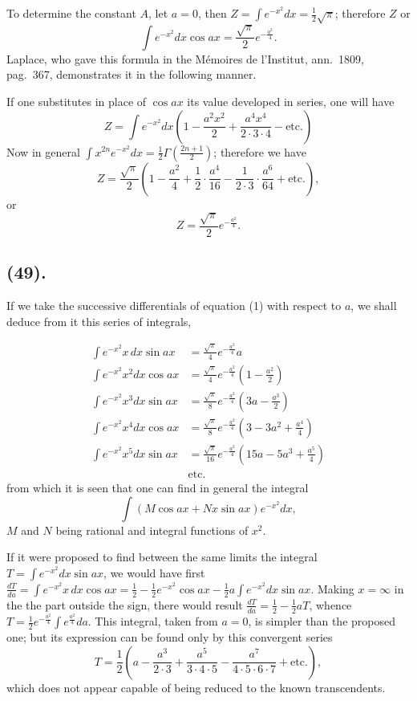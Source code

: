\documentclass{article}
\begin{document}
To determine the constant $A$, let $a=0$, then $\displaystyle Z=\int e^{-x^{2}}dx=\tfrac{1}{2}\sqrt{\pi}$; therefore $Z$ or
\[ \int e^{-x^{2}}dx\cos ax=\frac{\sqrt{\pi}}{2}e^{-\frac{a^{2}}{4}}. \tag{1} \]
Laplace, who gave this formula in the Mémoires de l'Institut, ann.\ 1809, pag.\ 367, demonstrates it in the following manner.

If one substitutes in place of $\cos ax$ its value developed in series, one will have
\[ Z=\int e^{-x^{2}}dx\left(1-\frac{a^{2}x^{2}}{2}+\frac{a^{4}x^{4}}{2\cdot3\cdot4}-\text{etc.}\right) \]
Now in general $\displaystyle\int x^{2n}e^{-x^{2}}dx=\tfrac{1}{2}\Gamma\left(\frac{2n+1}{2}\right)$; therefore we have
\[ Z=\frac{\sqrt{\pi}}{2}\left(1-\frac{a^{2}}{4}+\frac{1}{2}\cdot\frac{a^{4}}{16}-\frac{1}{2\cdot3}\cdot\frac{a^{6}}{64}+\text{etc.}\right), \]
or
\[ Z=\frac{\sqrt{\pi}}{2}e^{-\frac{a^{2}}{4}}. \]

\subsection*{(49).}

If we take the successive differentials of equation (1) with respect to $a$, we shall deduce from it this series of integrals,

\[ \begin{aligned} \int e^{-x^{2}}x\,dx\sin ax&=\frac{\sqrt{\pi}}{4}e^{-\frac{a^{2}}{4}}a\\ \int e^{-x^{2}}x^{2}dx\cos ax&=\frac{\sqrt{\pi}}{4}e^{-\frac{a^{2}}{4}}\left(1-\frac{a^{2}}{2}\right)\\ \int e^{-x^{2}}x^{3}dx\sin ax&=\frac{\sqrt{\pi}}{8}e^{-\frac{a^{2}}{4}}\left(3a-\frac{a^{3}}{2}\right)\\ \int e^{-x^{2}}x^{4}dx\cos ax&=\frac{\sqrt{\pi}}{8}e^{-\frac{a^{2}}{4}}\left(3-3a^{2}+\frac{a^{4}}{4}\right)\\ \int e^{-x^{2}}x^{5}dx\sin ax&=\frac{\sqrt{\pi}}{16}e^{-\frac{a^{2}}{4}}\left(15a-5a^{3}+\frac{a^{5}}{4}\right)\\ &\text{etc.} \end{aligned} \tag{2} \]
from which it is seen that one can find in general the integral
\[ \int(M\cos ax+Nx\sin ax)e^{-x^{2}}dx, \]
$M$ and $N$ being rational and integral functions of $x^{2}$.

If it were proposed to find between the same limits the integral $\displaystyle T=\int e^{-x^{2}}dx\sin ax$, we would have first $\displaystyle\frac{dT}{da}=\int e^{-x^{2}}x\,dx\cos ax=\tfrac{1}{2}-\tfrac{1}{2}e^{-x^{2}}\cos ax-\tfrac{1}{2}a\int e^{-x^{2}}dx\sin ax$. Making $x=\infty$ in the the part outside the sign, there would result $\frac{dT}{da}=\frac{1}{2}-\frac{1}{2}aT$, whence $\displaystyle T=\tfrac{1}{2}e^{-\frac{a^{2}}{4}}\int e^{\frac{a^{2}}{4}}da$. This integral, taken from $a=0$, is simpler than the proposed one; but its expression can be found only by this convergent series
\[ T=\frac{1}{2}\left(a-\frac{a^{3}}{2\cdot3}+\frac{a^{5}}{3\cdot4\cdot5}-\frac{a^{7}}{4\cdot5\cdot6\cdot7}+\text{etc.}\right), \]
which does not appear capable of being reduced to the known transcendents.
\end{document}
